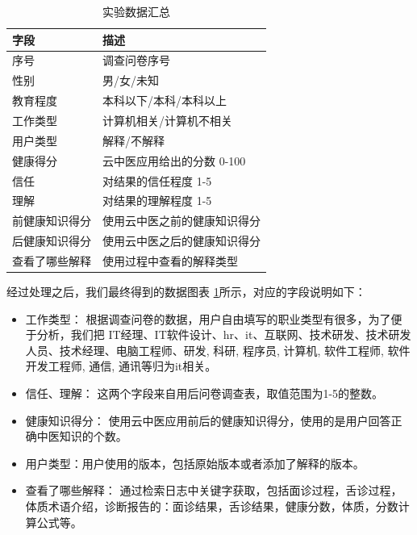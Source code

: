 \begin{table}[h]
    \centering
    \begin{tabular}{ll}
        \toprule
        字段 & 描述 \\ 
        \midrule
        序号 & 调查问卷序号 \\
        性别 & 男/女/未知 \\
        教育程度 & 本科以下/本科/本科以上 \\
        工作类型 & 计算机相关/计算机不相关 \\
        用户类型 & 解释/不解释 \\
        健康得分 & 云中医应用给出的分数 0-100 \\
        信任 & 对结果的信任程度 1-5 \\
        理解 & 对结果的理解程度 1-5 \\
        前健康知识得分 & 使用云中医之前的健康知识得分 \\
        后健康知识得分 & 使用云中医之后的健康知识得分 \\
        查看了哪些解释 & 使用过程中查看的解释类型 \\
        \bottomrule
    \end{tabular}
    \caption{实验数据汇总}
    \label{tab:exp_data}
\end{table}

经过处理之后，我们最终得到的数据图表 \ref{tab:exp_data}所示，对应的字段说明如下：

\begin{itemize}
  \item 工作类型： 根据调查问卷的数据，用户自由填写的职业类型有很多，为了便于分析，我们把 IT经理、IT软件设计、hr、it、互联网、技术研发、技术研发人员、技术经理、电脑工程师、研发, 科研, 程序员, 计算机, 软件工程师, 软件开发工程师, 通信, 通讯等归为it相关。

  \item  信任、理解： 这两个字段来自用后问卷调查表，取值范围为1-5的整数。

  \item  健康知识得分： 使用云中医应用前后的健康知识得分，使用的是用户回答正确中医知识的个数。

  \item  用户类型：用户使用的版本，包括原始版本或者添加了解释的版本。

  \item  查看了哪些解释： 通过检索日志中关键字获取，包括面诊过程，舌诊过程，体质术语介绍，诊断报告的：面诊结果，舌诊结果，健康分数，体质，分数计算公式等。
\end{itemize}

